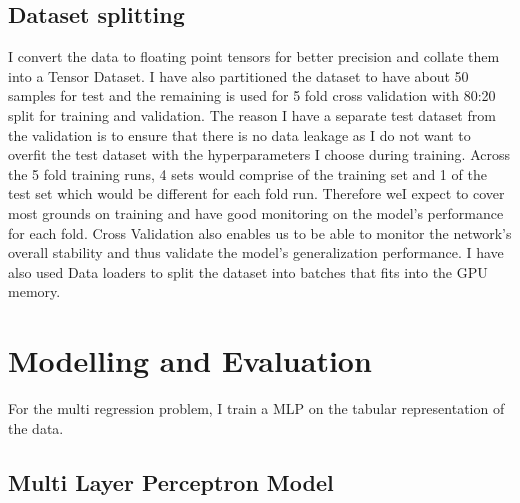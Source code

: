 \documentclass{report} %
\begin{document}
\section{Dataset splitting}\label{sec:Dataset splitting}
I convert the data to floating point tensors for better precision and collate them into a Tensor Dataset.
I have also partitioned the dataset to have about 50 samples for test and the remaining is used for 5 fold cross validation with 80:20 split for training and validation. 
The reason I have a separate test dataset from the validation is to ensure that there is no data leakage as I do not want to 
overfit the test dataset with the hyperparameters I choose during training. 
Across the 5 fold training runs, 4 sets would comprise of the training set and 1 of the test set which would be different for each fold run.
Therefore weI expect to cover most grounds on training and have good monitoring on the model's performance for each fold.
Cross Validation also enables us to be able to monitor the network's overall stability and thus validate the model's generalization performance.
I have also used Data loaders to split the dataset into batches that fits into the \ac{GPU} memory.

\chapter{Modelling and Evaluation}

For the multi regression problem, I train a \ac{MLP} on the tabular representation of the data.

\section{Multi Layer Perceptron Model}\label{sec:MLP Model}


\end{document}
